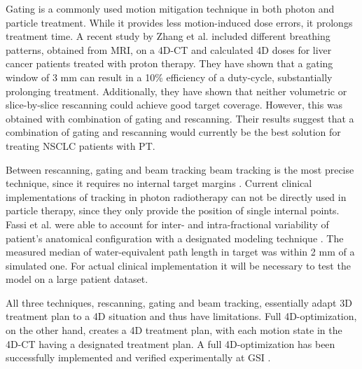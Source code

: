 
Gating is a commonly used motion mitigation technique in both photon and particle treatment. While it provides less motion-induced dose errors, it prolongs treatment time.
A recent study by Zhang et al. \cite{Zhang2015} included 
different breathing patterns, obtained from MRI, on a 4D-CT and calculated 4D doses for liver cancer patients treated with proton therapy. They have shown that a gating window of 3 mm can result
in a 10\% efficiency of a duty-cycle, 
substantially prolonging treatment. Additionally, they have shown that neither volumetric or slice-by-slice rescanning could achieve good target coverage.
However, this was obtained with combination
of gating and rescanning. Their results suggest that a combination of gating and rescanning would currently be the best solution for treating NSCLC patients with PT.

Between rescanning, gating and beam tracking beam tracking is the most precise technique, since it requires no internal target margins \cite{Bert2011}. 
Current clinical implementations of tracking in photon radiotherapy \cite{Kilby2010, Keall2014} can not be directly used in particle therapy, 
since they only provide the position of single internal points. Fassi et al. 
\cite{Fassi2015} were able to account for inter- and intra-fractional variability of patient's anatomical configuration with a designated modeling technique \cite{Fassi2014}.
The measured median of water-equivalent path length in target was within 2 mm of a simulated one. For actual clinical implementation it will be necessary to test the model
on a large patient dataset.

All three techniques, rescanning, gating and beam tracking, essentially adapt 3D treatment plan to a 4D situation and thus have limitations. Full 4D-optimization, on the other hand,
creates a 4D treatment plan, with each motion state in the 4D-CT having a designated treatment plan. A full 4D-optimization has been successfully implemented and verified experimentally at
GSI \cite{Graeff2013}.

